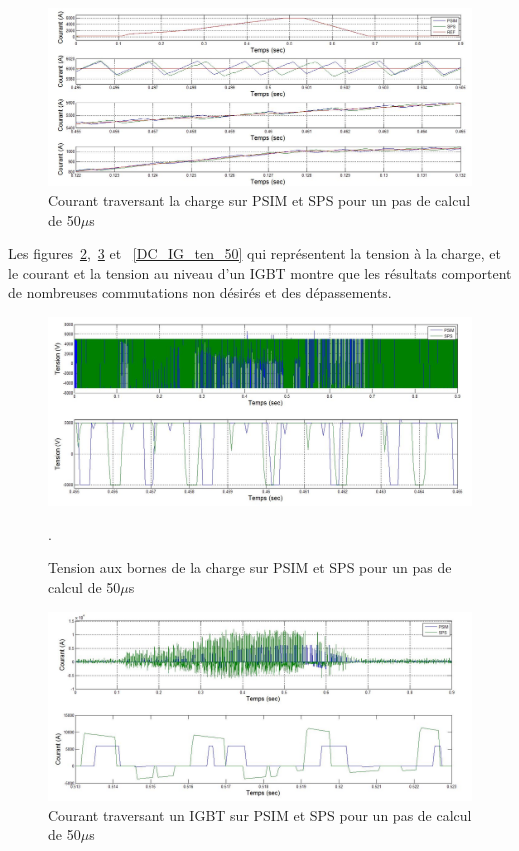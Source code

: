 \documentclass[11pt,letterpaper,final]{report}
\begin{document}
\begin{figure}[htb]
\centering
\includegraphics[scale=0.5]{Fig/DCPDCN/DCPCourantCharge50u.jpg}
\caption{Courant traversant la charge sur PSIM et SPS pour un pas de calcul de 50$\mu$s}
\label{DC_ch_cou_50}
\end{figure}

Les figures~\ref{DC_ch_ten_50},~\ref{DC_IG_cou_50} et ~\ref{DC_IG_ten_50} qui représentent la tension à la charge, et le courant et la tension au niveau d'un IGBT montre que les résultats comportent de nombreuses commutations non désirés et des dépassements.

\begin{figure}[htb]
\centering
\includegraphics[scale=0.5]{Fig/DCPDCN/DCPTensionCharge50u.jpg}
\caption{Tension aux bornes de la charge sur PSIM et SPS pour un pas de calcul de 50$\mu$s}.
\label{DC_ch_ten_50}
\end{figure}

\begin{figure}[htb]
\centering
\includegraphics[scale=0.5]{Fig/DCPDCN/DCPCourantIGBT50u.jpg}
\caption{Courant traversant un IGBT sur PSIM et SPS pour un pas de calcul de 50$\mu$s}
\label{DC_IG_cou_50}
\end{figure}
\end{document}
